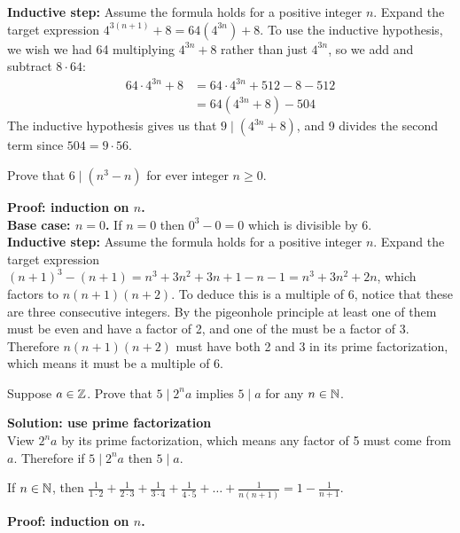 \documentclass{article}
\begin{document}
\textbf{Inductive step:} Assume the formula holds for a positive integer $n$. Expand the target expression $4^{3(n+1)} + 8 = 64(4^{3n}) + 8$. To use the inductive hypothesis, we wish we had 64 multiplying $4^{3n} + 8$ rather than just $4^{3n}$, so we add and subtract $8 \cdot 64$:
\begin{align*}
  64\cdot 4^{3n} + 8 & = 64 \cdot 4^{3n} + 512 - 8 - 512 \\
                     & = 64(4^{3n} + 8) - 504
\end{align*}
The inductive hypothesis gives us that $9 \mid (4^{3n} + 8)$, and 9 divides the second term since $504 = 9 \cdot 56$.

\begin{problem}
Prove that $6 \mid (n^3 - n)$ for ever integer $n \geq 0$.
\end{problem}

\textbf{Proof: induction on $n$.}
\\

\textbf{Base case: $n = 0$.} If $n = 0$ then $0^3 - 0 = 0$ which is divisible by 6.
\\

\textbf{Inductive step:} Assume the formula holds for a positive integer $n$. Expand the target expression $(n+1)^3 - (n+1) = n^3 + 3n^2 + 3n + 1 - n - 1 = n^3 + 3n^2 + 2n$, which factors to $n(n+1)(n+2)$. To deduce this is a multiple of 6, notice that these are three consecutive integers. By the pigeonhole principle at least one of them must be even and have a factor of 2, and one of the must be a factor of 3. Therefore $n(n+1)(n+2)$ must have both 2 and 3 in its prime factorization, which means it must be a multiple of 6.

\begin{problem}
Suppose $a \in \mathbb{Z}$. Prove that $5 \mid 2^n a$ implies $5 \mid a$ for any $n \in \mathbb{N}$.
\end{problem}
\textbf{Solution: use prime factorization}
\\

View $2^n a$ by its prime factorization, which means any factor of 5 must come from $a$. Therefore if $5 \mid 2^n a$ then $5 \mid a$.

\begin{problem}
If $n \in \mathbb{N}$, then $\frac{1}{1\cdot 2} + \frac{1}{2\cdot 3} + \frac{1}{3\cdot 4} + \frac{1}{4\cdot 5}+ \ldots + \frac{1}{n(n+1)} = 1 - \frac{1}{n+1}$.
\end{problem}
\textbf{Proof: induction on $n$.}
\\
\end{document}
